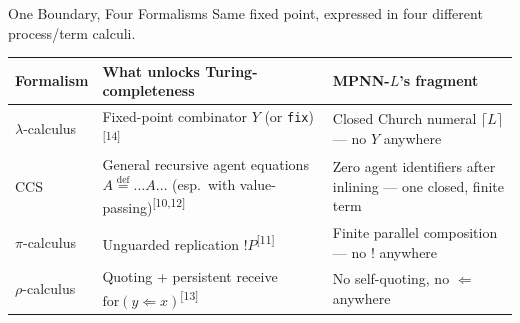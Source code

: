 \documentclass[10pt,aspectratio=169,draft]{beamer}
\newcommand{\pcite}[1]{\textsuperscript{[#1]}}
\begin{document}
\begin{frame}{One Boundary, Four Formalisms}
  Same fixed point, expressed in four different process/term calculi.
  \vspace{0.15cm}
  \begin{center}
  \footnotesize
  \begin{tabular}{@{}l p{5.6cm} p{4.4cm}@{}}
  \toprule
  \textbf{Formalism} & \textbf{What unlocks Turing-completeness} & \textbf{MPNN-$L$'s fragment} \\
  \midrule
  $\lambda$-calculus & Fixed-point combinator $Y$ (or \texttt{fix})\pcite{14} &
    Closed Church numeral $\lceil L \rceil$ --- no $Y$ anywhere \\
  CCS & General recursive agent equations $A \stackrel{\mathrm{def}}{=} \ldots A \ldots$
    (esp.\ with value-passing)\pcite{10,12} &
    Zero agent identifiers after inlining --- one closed, finite term \\
  $\pi$-calculus & Unguarded replication $!P$\pcite{11} &
    Finite parallel composition --- no $!$ anywhere \\
  $\rho$-calculus & Quoting + persistent receive $\mathrm{for}(y\Leftarrow x)$\pcite{13} &
    No self-quoting, no $\Leftarrow$ anywhere \\
  \bottomrule
  \end{tabular}
  \end{center}
  \vspace{0.2cm}
  {\footnotesize{}}
\end{frame}
\end{document}
